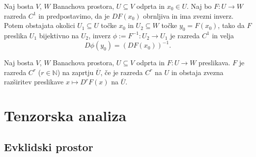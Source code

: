 \begin{izrek}
	Naj bosta $V$, $W$ Banachova prostora, $U\subseteq V$ odprta in $x_0\in U$. Naj bo
	$F\colon U\to W$ razreda $C^1$ in predpostavimo, da je $DF(x_0)$ obrnljiva in
	ima zvezni inverz. Potem obstajata okolici $U_1\subseteq U$ točke $x_0$ in
	$U_2\subseteq W$ točke $y_0=F(x_0)$, tako da $F$ preslika $U_1$ bijektivno na
	$U_2$, inverz $\phi:=F^{-1}\colon U_2\to U_1$ je razreda $C^1$ in velja
	\[ D\phi(y_0)=(DF(x_0))^{-1}. \]
\end{izrek}

\begin{definicija}
	Naj bosta $V$, $W$ Banachova prostora, $U\subseteq V$ odprta in $F\colon U\to W$ preslikava. 
	$F$ je razreda $C^r$ ($r\in\mathbb{N}$) na zaprtju $\overline{U}$, če je razreda $C^r$ na $U$ in
	obstaja zvezna razširitev preslikave $x\mapsto D^rF(x)$ na $\overline{U}$.
\end{definicija}

\begin{comment}
Naj bosta $(V_1,\|\cdot\|_1)$, $(V_2,\|\cdot\|_2)$ Banachova prostora. $V=V_1\times V_2$
je vektorski prostor, z ustrezno definirano normo $\|\cdot\|_V$, porojeno iz norm $\|\cdot\|_1$ in $\|\cdot\|_2$,
pa postane Banachov prostor. Naj bo $F\colon U\to W$, kjer je $U\subseteq V$ odprta množica, in naj bosta
\[ U_1=\{x\in V_1\;;\ (x,y_0)\in U\}\quad\textrm{ter}\quad U_2=\{y\in V_2\;;\ (x_0,y)\in U\}. \]
Če v točki $(x_0,y_0)\in U$ obstajata
\begin{itemize}
\item odvod preslikave $F(\cdot,y_0)\colon U_1\to W$, ki ga označimo z $\partial_1 F(x_0,y_0)$ in
\item odvod preslikave $F(x_0,\cdot)\colon U_2\to W$, ki ga označimo z $\partial_2 F(x_0,y_0)$
\end{itemize}
in sta oba zvezna, potem je $F$ odvedljiva v $(x_0,y_0)$ in velja
\[ DF(x_0,y_0)(u,v)=\partial_1 F(x_0,y_0)(u)+\partial_2 F(x_0,y_0)(v). \]
\end{comment}


\section{Tenzorska analiza}


\subsection{Evklidski prostor}


